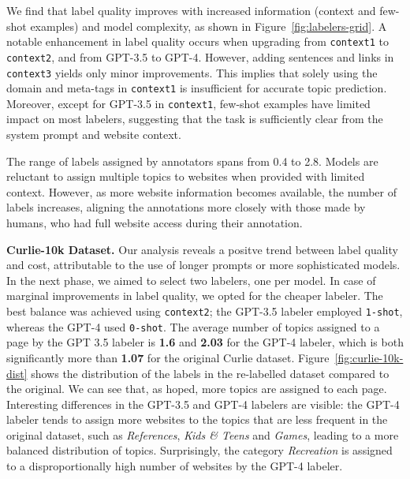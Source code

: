We find that label quality improves with increased information (context and few-shot examples) and model complexity, as shown in Figure~\ref{fig:labelers-grid}. A notable enhancement in label quality occurs when upgrading from \texttt{context1} to \texttt{context2}, and from GPT-3.5 to GPT-4. However, adding sentences and links in \texttt{context3} yields only minor improvements. This implies that solely using the domain and meta-tags in \texttt{context1} is insufficient for accurate topic prediction. Moreover, except for GPT-3.5 in \texttt{context1}, few-shot examples have limited impact on most labelers, suggesting that the task is sufficiently clear from the system prompt and website context.

The range of labels assigned by annotators spans from 0.4 to 2.8. Models are reluctant to assign multiple topics to websites when provided with limited context. However, as more website information becomes available, the number of labels increases, aligning the annotations more closely with those made by humans, who had full website access during their annotation.




\textbf{Curlie-10k Dataset.} Our analysis reveals a positve trend between label quality and cost, attributable to the use of longer prompts or more sophisticated models. In the next phase, we aimed to select two labelers, one per model. In case of marginal improvements in label quality, we opted for the cheaper labeler. 
The best balance was achieved using \texttt{context2}; the GPT-3.5 labeler employed \texttt{1-shot}, whereas the GPT-4 used \texttt{0-shot}. The average number of topics assigned to a page by the GPT 3.5 labeler is \textbf{1.6} and \textbf{2.03} for the GPT-4 labeler, which is both significantly more than \textbf{1.07} for the original Curlie dataset. Figure~\ref{fig:curlie-10k-dist} shows the distribution of the labels in the re-labelled dataset compared to the original. We can see that, as hoped, more topics are assigned to each page. Interesting differences in the GPT-3.5 and GPT-4 labelers are visible: the GPT-4 labeler tends to assign more websites to the topics that are less frequent in the original dataset, such as \textit{References}, \textit{Kids \& Teens} and \textit{Games}, leading to a more balanced distribution of topics. Surprisingly, the category \textit{Recreation} is assigned to a disproportionally high number of websites by the GPT-4 labeler.

